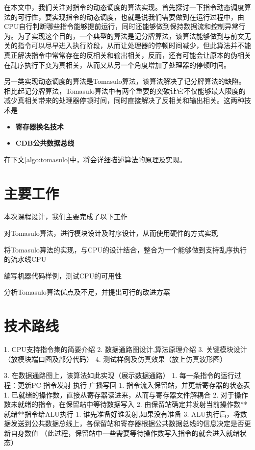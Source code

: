 \documentclass[twoside]{article}
\begin{document}
在本文中，我们关注对指令的动态调度的算法实现。首先探讨一下指令动态调度算法的可行性，要实现指令的动态调度，也就是说我们需要做到在运行过程中，由CPU自行判断哪些指令能够提前运行，同时还能够做到保持数据流和控制异常行为。为了实现这个目的，一个典型的算法是记分牌算法，该算法能够做到与前文无关的指令可以尽早进入执行阶段，从而让处理器的停顿时间减少，但此算法并不能真正解决指令中常常存在的反相关和输出相关，反而，还有可能会让原本的伪相关在乱序执行下变为真相关，从而又从另一个角度增加了处理器的停顿时间。

另一类实现动态调度的算法是Tomasulo算法，该算法解决了记分牌算法的缺陷。相比起记分牌算法，Tomasulo算法中有两个重要的突破\cite{wiki:tomasulo}让它不仅能够最大限度的减少真相关带来的处理器停顿时间，同时直接解决了反相关和输出相关。这两种技术是
\begin{itemize}
	\item \textbf{寄存器换名技术} 
	\item \textbf{CDB公共数据总线}
\end{itemize}
在下文\autoref{algo:tomasulo}中，将会详细描述算法的原理及实现。



\section{主要工作}
本次课程设计，我们主要完成了以下工作
\begin{compactitem}
	\item 对Tomasulo算法，进行模块设计及时序设计，从而使用硬件的方式实现
	\item 将Tomasulo算法的实现，与CPU的设计结合，整合为一个能够做到支持乱序执行的流水线CPU
	\item 编写机器代码样例，测试CPU的可用性
	\item 分析Tomasulo算法优点及不足，并提出可行的改进方案
\end{compactitem}

\section{技术路线}

1. CPU支持指令集的简要介绍
2. 数据通路图设计,算法原理介绍\label{algo:tomasulo}
3. 关键模块设计（放模块端口图及部分代码）
4. 测试样例及仿真效果（放上仿真波形图）


3. 在数据通路图上，该算法如此实现（展示数据通路）
  1. 每一条指令的运行过程：更新PC-指令发射-执行-广播写回
  1. 指令流入保留站，并更新寄存器的状态表
      1. 已就绪的操作数，直接从寄存器读进来，从而与寄存器文件解耦合
      2. 对于操作数未就绪的指令，在保留站中等待数据写入
  2. 由保留站确定并发射当前操作数**就绪**指令给ALU执行
      1. 谁先准备好谁发射,如果没有准备
  3. ALU执行后，将数据发送到公共数据总线上，各保留站和寄存器根据公共数据总线的信息决定是否更新自身数值
  （此过程，保留站中一些需要等待操作数写入指令的就会进入就绪状态）
\end{document}
